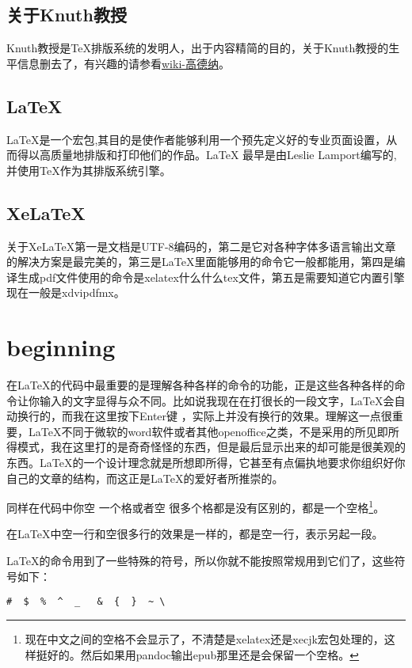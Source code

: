 \documentclass[12pt,oneside]{book}
\begin{document}
\section{关于Knuth教授}
Knuth教授是\TeX 排版系统的发明人，出于内容精简的目的，关于Knuth教授的生平信息删去了，有兴趣的请参看\href{http://zh.wikipedia.org/wiki/%E9%AB%98%E5%BE%B7%E7%BA%B3}{wiki-高德纳}。

\section{LaTeX}
LaTeX是一个宏包,其目的是使作者能够利用一个预先定义好的专业页面设置，从而得以高质量地排版和打印他们的作品。LaTeX 最早是由Leslie Lamport编写的,并使用\TeX 作为其排版系统引擎\cite{lshort}。

\section{XeLaTeX}
关于XeLaTeX第一是文档是UTF-8编码的，第二是它对各种字体多语言输出文章的解决方案是最完美的，第三是LaTeX里面能够用的命令它一般都能用，第四是编译生成pdf文件使用的命令是xelatex什么什么tex文件，第五是需要知道它内置引擎现在一般是xdvipdfmx。


\chapter{beginning}
在\LaTeX 的代码中最重要的是理解各种各样的命令的功能，正是这些各种各样的命令让你输入的文字显得与众不同。比如说我现在在打很长的一段文字，\LaTeX 会自动换行的，而我在这里按下Enter键
，实际上并没有换行的效果。理解这一点很重要，\LaTeX 不同于微软的word软件或者其他openoffice之类，不是采用的所见即所得模式，我在这里打的是奇奇怪怪的东西，但是最后显示出来的却可能是很美观的东西。\LaTeX 的一个设计理念就是所想即所得，它甚至有点偏执地要求你组织好你自己的文章的结构，而这正是\LaTeX 的爱好者所推崇的。

同样在代码中你空 一个格或者空      很多个格都是没有区别的，都是一个空格\footnote{现在中文之间的空格不会显示了，不清楚是xelatex还是xecjk宏包处理的，这样挺好的。然后如果用pandoc输出epub那里还是会保留一个空格。}。



在\LaTeX 中空一行和空很多行的效果是一样的，都是空一行，表示另起一段。

\LaTeX 的命令用到了一些特殊的符号，所以你就不能按照常规用到它们了，这些符号如下：
\begin{Verbatim}
#  $  %  ^  _   &  {  }  ~ \
\end{Verbatim}
\end{document}
